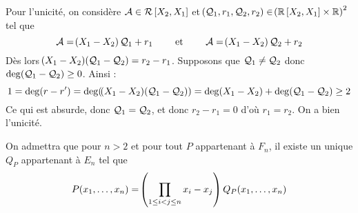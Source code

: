 \documentclass[a4paper,french,bookmarks]{article}
\begin{document}
\begin{enumerate}
\begin{nproof}
            Pour l'unicité, on considère $\mathcal{A} \in \mathcal{R}\left[X_2, X_1\right]$ et $\!\left(\mathcal{Q}_1,
            r_1, \mathcal{Q}_2, r_2\right) \in \!\left(\mathbb{R}\left[X_2, X_1\right] \times \mathbb{R}\right)^2$ tel que
            \[ \mathcal{A} = \!\left(X_1 - X_2\right)\mathcal{Q}_1 + r_1 \qquad\ \text{et} \ \qquad \mathcal{A} = 
            \!\left(X_1 - X_2\right)\mathcal{Q}_2 + r_2 \]
            Dès lors $\!\left(X_1 - X_2\right)\!\left(\mathcal{Q}_1 - \mathcal{Q}_2\right) = r_2 - r_1$. Supposons que 
            $\mathcal{Q}_1 \neq \mathcal{Q}_2$ donc $\deg\!\left(\mathcal{Q}_1 - \mathcal{Q}_2\right) \geq 0$. Ainsi :
            \[ 1 = \deg\!\left(r - r'\right) = \deg\!\left(\!\left(X_1 - X_2\right)\!\left(\mathcal{Q}_1 - \mathcal{Q}_2\right)\right) = 
            \deg\!\left(X_1 - X_2\right) + \deg\!\left(\mathcal{Q}_1 - \mathcal{Q}_2\right) \geq 2\]
            Ce qui est absurde, donc $\mathcal{Q}_1 = \mathcal{Q}_2$, et donc $r_2 - r_1 = 0$ d'où 
            $r_1 = r_2$. On a bien l'unicité.
        \end{nproof}
        \yesafter
    \end{enumerate}
    On admettra que pour $n > 2$ et pour tout $P$ appartenant à $F_n$, il
    existe un unique $Q_P$ appartenant à $E_n$ tel que
    \[ P\!\left(x_1, \dots, x_n\right) = \!\left(\prod_{1 \leq i < j \leq n} x_i - x_j\right)Q_P\!\left(x_1,
    \dots,  x_n\right)\]
\end{document}
